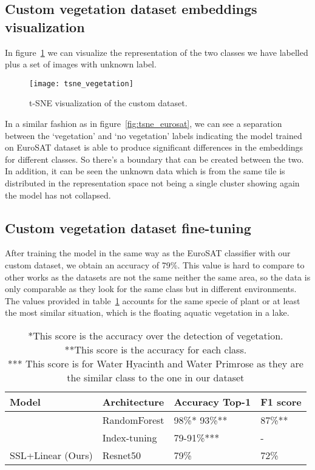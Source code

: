 \documentclass[conference]{IEEEtran}
\begin{document}
    \subsection{Custom vegetation dataset embeddings visualization}
    In figure~\ref{fig:tsne_vegetation} we can visualize the representation of the two classes we have labelled plus a set of images
    with unknown label.

    \begin{figure}[t]
        \centering
        \texttt{[image: tsne\_vegetation]}
        \caption{t-SNE visualization of the custom dataset.}
        \label{fig:tsne_vegetation}
    \end{figure}

    In a similar fashion as in figure~\ref{fig:tsne_eurosat}, we can see a separation between the `vegetation' and `no vegetation' labels
    indicating the model trained on EuroSAT dataset is able to produce significant differences in the embeddings for different classes.
    So there's a boundary that can be created between the two.
    In addition, it can be seen the unknown data which is from the same tile is distributed in the representation space not being a single cluster
    showing again the model has not collapsed.

    \subsection{Custom vegetation dataset fine-tuning}
    After training the model in the same way as the EuroSAT classifier with our custom dataset, we obtain an accuracy of 79\%.
    This value is hard to compare to other works as the datasets are not the same neither the same area, so the data is only comparable as they look for the same
    class but in different environments.
    The values provided in table~\ref{table:vegetation_results} accounts for the same specie of plant or at least the most similar situation,
    which is the floating aquatic vegetation in a lake.
    \begin{table}[h!]
        \centering
        \begin{tabular}{ |p{2.2cm}||p{1.5cm}|p{2.2cm}|p{1cm}|}
            \hline
            Model              & Architecture & Accuracy Top-1 & F1 score \\
            \hline
            \hline
            \citet{rs12244021} & RandomForest & 98\%* 93\%**   & 87\%**   \\
            \citet{rs14133013} & Index-tuning & 79-91\%***     & -        \\
            SSL+Linear (Ours)  & Resnet50     & 79\%           & 72\%     \\
            \hline
        \end{tabular}
        \caption{
            *This score is the accuracy over the detection of vegetation. \\
            **This score is the accuracy for each class. \\
            *** This score is for Water Hyacinth and Water Primrose as they are the similar class to the one in our dataset}
        \label{table:vegetation_results}
    \end{table}
\end{document}
